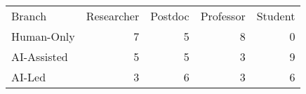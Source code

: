 \begin{tabular}{lrrrr}
\hline\hline
Branch & Researcher & Postdoc & Professor & Student \\
Human-Only & 7 & 5 & 8 & 0 \\
AI-Assisted & 5 & 5 & 3 & 9 \\
AI-Led & 3 & 6 & 3 & 6 \\
\hline\hline
\end{tabular}
